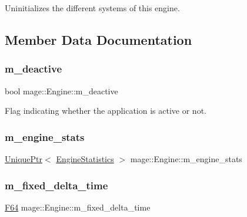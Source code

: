 Uninitializes the different systems of this engine. 

\subsection{Member Data Documentation}
\hypertarget{classmage_1_1_engine_ab8a4b0157403708ae7d1d018a95b4c63}{}\label{classmage_1_1_engine_ab8a4b0157403708ae7d1d018a95b4c63} 
\subsubsection{\texorpdfstring{m\+\_\+deactive}{m\_deactive}}
{\footnotesize\ttfamily bool mage\+::\+Engine\+::m\+\_\+deactive\hspace{0.3cm}{\ttfamily [private]}}

Flag indicating whether the application is active or not. \hypertarget{classmage_1_1_engine_aa0c82f248a2fbec3fbf778665a440edc}{}\label{classmage_1_1_engine_aa0c82f248a2fbec3fbf778665a440edc} 
\subsubsection{\texorpdfstring{m\+\_\+engine\+\_\+stats}{m\_engine\_stats}}
{\footnotesize\ttfamily \hyperlink{namespacemage_a3316d7143a973e37adf1110f2e80ca31}{Unique\+Ptr}$<$ \hyperlink{classmage_1_1_engine_statistics}{Engine\+Statistics} $>$ mage\+::\+Engine\+::m\+\_\+engine\+\_\+stats\hspace{0.3cm}{\ttfamily [private]}}

\hypertarget{classmage_1_1_engine_a95557e1b6cba52b393c94d80d80bea4c}{}\label{classmage_1_1_engine_a95557e1b6cba52b393c94d80d80bea4c} 
\subsubsection{\texorpdfstring{m\+\_\+fixed\+\_\+delta\+\_\+time}{m\_fixed\_delta\_time}}
{\footnotesize\ttfamily \hyperlink{namespacemage_ad26233bbec640deda836e572c1a23708}{F64} mage\+::\+Engine\+::m\+\_\+fixed\+\_\+delta\+\_\+time\hspace{0.3cm}{\ttfamily [private]}}


